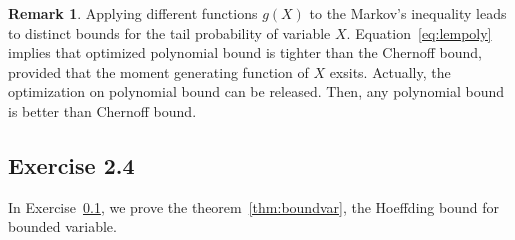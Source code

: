 \documentclass[11pt]{article}
\theoremstyle{plain}
\theoremstyle{definition}
\newtheorem{rmk}{Remark}
\begin{document}
\begin{rmk}
	Applying different functions $g(X)$ to the Markov's inequality leads to distinct bounds for the tail probability of variable $X$. Equation~\eqref{eq:lempoly} implies that optimized polynomial bound is tighter than the Chernoff bound, provided that the moment generating function of $X$ exsits. Actually, the optimization on polynomial bound can be released. Then, any polynomial bound is better than Chernoff bound. 
\end{rmk}

\subsection{Exercise 2.4}\label{pro:boundvar}
In Exercise~\ref{pro:boundvar}, we prove the theorem~\ref{thm:boundvar},  the Hoeffding bound for bounded variable. 
\end{document}
